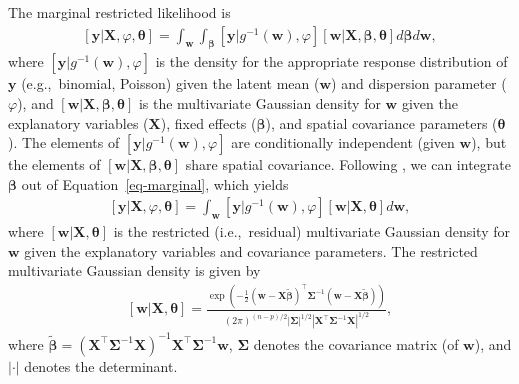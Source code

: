 \documentclass[
]{jss}
\begin{document}
The marginal restricted likelihood is \begin{align}\label{eq-marginal}
  [\mathbf{y}|\mathbf{X}, \varphi, \boldsymbol{\theta}] = \int_{\mathbf{w}} \int_{\boldsymbol{\beta}} [\mathbf{y} | g^{-1}(\mathbf{w}), \varphi] [\mathbf{w} | \mathbf{X}, \boldsymbol{\beta}, \boldsymbol{\theta}] d\boldsymbol{\beta} d\mathbf{w},
\end{align} where \([\mathbf{y} | g^{-1}(\mathbf{w}), \varphi]\) is the
density for the appropriate response distribution of \(\mathbf{y}\)
(e.g.,~binomial, Poisson) given the latent mean (\(\mathbf{w}\)) and
dispersion parameter (\(\varphi\)), and
\([\mathbf{w} | \mathbf{X}, \boldsymbol{\beta}, \boldsymbol{\theta}]\)
is the multivariate Gaussian density for \(\mathbf{w}\) given the
explanatory variables (\(\mathbf{X}\)), fixed effects
(\(\boldsymbol{\beta}\)), and spatial covariance parameters
(\(\boldsymbol{\theta}\)). The elements of
\([\mathbf{y} | g^{-1}(\mathbf{w}), \varphi]\) are conditionally
independent (given \(\mathbf{w}\)), but the elements of
\([\mathbf{w} | \mathbf{X}, \boldsymbol{\beta}, \boldsymbol{\theta}]\)
share spatial covariance. Following \citet{harville1974bayesian}, we can
integrate \(\boldsymbol{\beta}\) out of Equation~\ref{eq-marginal},
which yields \begin{align}\label{eq-marginal2}
  [\mathbf{y}|\mathbf{X}, \varphi, \boldsymbol{\theta}] = \int_{\mathbf{w}} [\mathbf{y} | g^{-1}(\mathbf{w}), \varphi] [\mathbf{w} | \mathbf{X}, \boldsymbol{\theta}] d\mathbf{w},
\end{align} where \([\mathbf{w} | \mathbf{X}, \boldsymbol{\theta}]\) is
the restricted (i.e.,~residual) multivariate Gaussian density
\citep{patterson1971recovery} for \(\mathbf{w}\) given the explanatory
variables and covariance parameters. The restricted multivariate
Gaussian density is given by \begin{align}\label{eq-reml-def}
[\mathbf{w} | \mathbf{X}, \boldsymbol{\theta}] = \frac{\exp(-\frac{1}{2}(\mathbf{w} - \mathbf{X}\tilde{\boldsymbol{\beta}})^\top \boldsymbol{\Sigma}^{-1} (\mathbf{w} - \mathbf{X}\tilde{\boldsymbol{\beta}}))}{(2 \pi)^{(n - p)/2} |\boldsymbol{\Sigma}|^{1/2}|\mathbf{X}^\top \boldsymbol{\Sigma}^{-1} \mathbf{X}|^{1/2}},
\end{align} where
\(\tilde{\boldsymbol{\beta}} = (\mathbf{X}^\top \boldsymbol{\Sigma}^{-1} \mathbf{X})^{-1} \mathbf{X}^\top \boldsymbol{\Sigma}^{-1} \mathbf{w}\),
\(\boldsymbol{\Sigma}\) denotes the covariance matrix (of
\(\mathbf{w}\)), and \(|\cdot|\) denotes the determinant.
\end{document}
